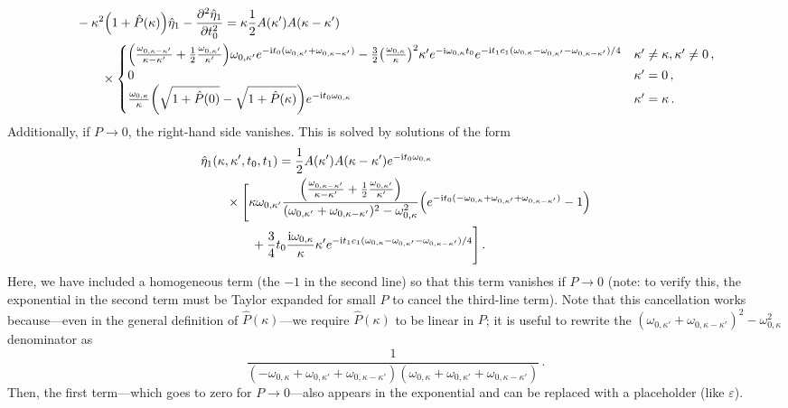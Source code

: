 \documentclass{jfm}
\newcommand{\GenPk}{\hat{P}(\kappa)}
\newcommand{\PZerok}{\hat{P}(0)}
\newcommand{\im}{\mathrm{i}}
\renewcommand*{\epsilon}{\varepsilon}
\begin{document}
\begin{equation}
  \begin{split}
  &-\kappa^2 \pqty{1 + \GenPk} \hat{\eta}_1 - \pdv[2]{\hat{\eta}_1}{t_0}
    =
    \kappa \frac{1}{2} A(\kappa') A(\kappa-\kappa')
    \\ &\qquad \times
    \begin{cases}
    \pqty{
      \frac{\omega_{0,\kappa-\kappa'}}{\kappa-\kappa'}
      + \frac{1}{2} \frac{\omega_{0,\kappa'}}{\kappa'}
    } \omega_{0,\kappa'}
    e^{-\im t_0 (\omega_{0,\kappa'} + \omega_{0,\kappa-\kappa'})}
    - \frac{3}{2} \pqty{\frac{\omega_{0,\kappa}}{\kappa}}^2 \kappa'
    e^{-\im \omega_{0,\kappa} t_0}
    e^{-\im t_1 c_1 (\omega_{0,\kappa} - \omega_{0,\kappa'} -
    \omega_{0,\kappa-\kappa'})/4} & \kappa' \neq \kappa, \kappa' \neq 0
    \,,
    \\
    0 & \kappa' = 0 \,, \\
    \frac{\omega_{0,\kappa}}{\kappa} \pqty{\sqrt{1+\PZerok} -
      \sqrt{1+\GenPk}} e^{-\im t_0 \omega_{0,\kappa}}
      & \kappa' = \kappa \,.
    \end{cases}
  \end{split}
  \label{eq:strong_cases}
\end{equation}
Additionally, if $P \to 0$, the right-hand side vanishes.
This is solved by solutions of the form
\begin{equation}
  \begin{split}
  &\hat{\eta}_1(\kappa,\kappa',t_0,t_1) =
  \frac{1}{2} A(\kappa') A(\kappa-\kappa') e^{-\im t_0 \omega_{0,\kappa}}
  \\ &\qquad \times
  \Biggl[
     \kappa \omega_{0,\kappa'} \frac{ \pqty{
      \frac{\omega_{0,\kappa-\kappa'}}{\kappa-\kappa'}
      +\frac{1}{2} \frac{\omega_{0,\kappa'}}{\kappa'}
    } }
    { (\omega_{0,\kappa'} + \omega_{0,\kappa-\kappa'})^2 - \omega_{0,\kappa}^2}
    \pqty{
      e^{-\im t_0 (-\omega_{0,\kappa} + \omega_{0,\kappa'} + \omega_{0,\kappa-\kappa'})}
      - 1
    } \\
  &\qquad \qquad
    + \frac{3}{4} t_0 \frac{\im \omega_{0,\kappa}}{\kappa} \kappa'
    e^{-\im t_1 c_1 (\omega_{0,\kappa} -
    \omega_{0,\kappa'} - \omega_{0,\kappa-\kappa'})/4}
  \Biggr]
  \,.
  \end{split}
  \label{eq:strong_2nd_sol}
\end{equation}
Here, we have included a homogeneous term (the $-1$ in the second line)
so that this term vanishes if $P \to 0$ (note: to verify this, the
exponential in the second term must be Taylor expanded for small $P$ to
cancel the third-line term).
Note that this cancellation works because---even in the general
definition of $\GenPk$---we require $\GenPk$ to be linear in $P$;
it is useful to rewrite the $(\omega_{0,\kappa'} +
\omega_{0,\kappa-\kappa'})^2 - \omega_{0,\kappa}^2$ denominator as
\[
  \frac{1}{
    (-\omega_{0,\kappa} + \omega_{0,\kappa'} + \omega_{0,\kappa-\kappa'})
    (\omega_{0,\kappa} + \omega_{0,\kappa'} + \omega_{0,\kappa-\kappa'})
  } \,.
\]
Then, the first term---which goes to zero for $P \to 0$---also appears
in the exponential and can be replaced with a placeholder (like
$\epsilon$).
\end{document}
